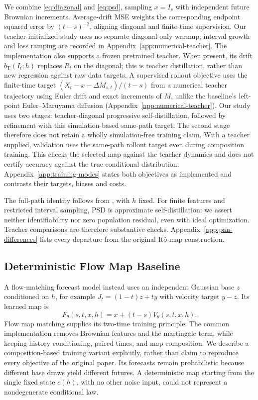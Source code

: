 We combine \eqref{eq:diagonal} and \eqref{eq:psd}, sampling $x=I_s$ with independent future Brownian increments. Average-drift MSE weights the corresponding endpoint squared error by $(t-s)^{-2}$, aligning diagonal and finite-time supervision. Our teacher-initialized study uses no separate diagonal-only warmup; interval growth and loss ramping are recorded in Appendix~\ref{app:numerical-teacher}. The implementation also supports a frozen pretrained teacher. When present, its drift $b_{\mathrm T}(I_t;h)$ replaces $R_t$ on the diagonal; this is teacher distillation, rather than new regression against raw data targets. A supervised rollout objective uses the finite-time target $(X_t-x-\Delta M_{s,t})/(t-s)$ from a numerical teacher trajectory using Euler drift and exact increments of $M$, unlike the baseline's left-point Euler--Maruyama diffusion (Appendix~\ref{app:numerical-teacher}). Our study uses two stages: teacher-diagonal progressive self-distillation, followed by refinement with this simulation-based same-path target. The second stage therefore does not retain a wholly simulation-free training claim. With a teacher supplied, validation uses the same-path rollout target even during composition training. This checks the selected map against the teacher dynamics and does not certify accuracy against the true conditional distribution. Appendix~\ref{app:training-modes} states both objectives as implemented and contrasts their targets, biases and costs.

The full-path identity follows from \citet{pan2026itomaps}, with $h$ fixed. For finite features and restricted interval sampling, PSD is approximate self-distillation: we assert neither identifiability nor zero population residual, even with ideal optimization. Teacher comparisons are therefore substantive checks. Appendix~\ref{app:pan-differences} lists every departure from the original It\^o-map construction.

\subsection{Deterministic Flow Map Baseline}\label{sec:flow-map-baseline}
A flow-matching forecast model instead uses an independent Gaussian base $z$ conditioned on $h$, for example $J_t=(1-t)z+ty$ with velocity target $y-z$. Its learned map is
\begin{equation}
 F_\theta(s,t,x,h)=x+(t-s)V_\theta(s,t,x,h).
\end{equation}
Flow map matching \citep{boffi2025flowmaps} supplies its two-time training principle. The common implementation removes Brownian features and the martingale term, while keeping history conditioning, paired times, and map composition. We describe a composition-based training variant explicitly, rather than claim to reproduce every objective of the original paper. Its forecasts remain probabilistic because different base draws yield different futures. A deterministic map starting from the single fixed state $c(h)$, with no other noise input, could not represent a nondegenerate conditional law.

